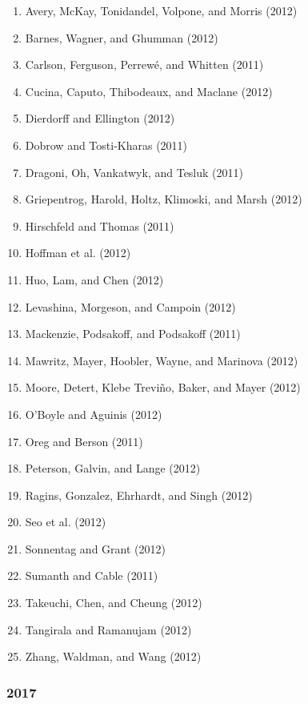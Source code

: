 \documentclass[english,man]{apa6}
\providecommand{\tightlist}{%
  \setlength{\itemsep}{0pt}\setlength{\parskip}{0pt}}
\theoremstyle{definition}
\theoremstyle{definition}
\theoremstyle{definition}
\theoremstyle{remark}
\begin{document}
\begin{enumerate}
\def\labelenumi{\arabic{enumi})}
\tightlist
\item
  Avery, McKay, Tonidandel, Volpone, and Morris (2012)
\item
  Barnes, Wagner, and Ghumman (2012)
\item
  Carlson, Ferguson, Perrewé, and Whitten (2011)
\item
  Cucina, Caputo, Thibodeaux, and Maclane (2012)
\item
  Dierdorff and Ellington (2012)
\item
  Dobrow and Tosti-Kharas (2011)
\item
  Dragoni, Oh, Vankatwyk, and Tesluk (2011)
\item
  Griepentrog, Harold, Holtz, Klimoski, and Marsh (2012)
\item
  Hirschfeld and Thomas (2011)
\item
  Hoffman et al. (2012)
\item
  Huo, Lam, and Chen (2012)
\item
  Levashina, Morgeson, and Campoin (2012)
\item
  Mackenzie, Podsakoff, and Podsakoff (2011)
\item
  Mawritz, Mayer, Hoobler, Wayne, and Marinova (2012)
\item
  Moore, Detert, Klebe Treviño, Baker, and Mayer (2012)
\item
  O'Boyle and Aguinis (2012)
\item
  Oreg and Berson (2011)
\item
  Peterson, Galvin, and Lange (2012)
\item
  Ragins, Gonzalez, Ehrhardt, and Singh (2012)
\item
  Seo et al. (2012)
\item
  Sonnentag and Grant (2012)
\item
  Sumanth and Cable (2011)
\item
  Takeuchi, Chen, and Cheung (2012)
\item
  Tangirala and Ramanujam (2012)
\item
  Zhang, Waldman, and Wang (2012)
\end{enumerate}

\subsubsection{2017}\label{section-31}
\end{document}
